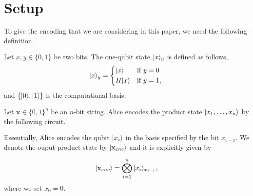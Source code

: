 \section{Setup}

To give the encoding that we are considering in this paper, we need the following definition.
\begin{definition}
 Let $x,y\in \{0,1\}$ be two bits. The one-qubit state $|x\rangle_y$ is defined as follows,
 \begin{equation*}
  \ket{x}_y =
    \begin{cases*}
      \ket{x} & if $y=0$\\
      H\ket{x} & if $y=1$,
    \end{cases*}
 \end{equation*}
 and $\{|0\rangle,|1\rangle\}$ is the computational basis.

\end{definition}


Let $\textbf{x}\in \{0,1\}^n$ be an $n$-bit string. Alice encodes the product state $|x_1,\dots,x_n\rangle$ by the following circuit.

Essentially, Alice encodes the qubit $|x_i\rangle$ in the basis specified by the bit $x_{i-1}$. We denote the ouput product state by $|\textbf{x}_{enc}\rangle$ and it is explicitly given by

\begin{align*}
 |\textbf{x}_{enc}\rangle = \bigotimes_{i=1}^n|x_i\rangle_{x_{i-1}},
\end{align*}
where we set $x_0=0$.
